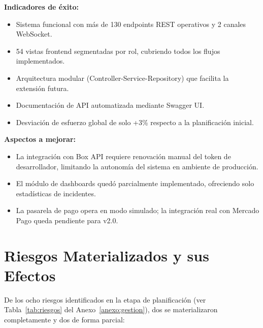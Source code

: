 \textbf{Indicadores de éxito:}
\begin{itemize}
    \item Sistema funcional con más de 130 endpoints REST operativos y 2 canales WebSocket.
    \item 54 vistas frontend segmentadas por rol, cubriendo todos los flujos implementados.
    \item Arquitectura modular (Controller-Service-Repository) que facilita la extensión futura.
    \item Documentación de API automatizada mediante Swagger UI.
    \item Desviación de esfuerzo global de solo +3\% respecto a la planificación inicial.
\end{itemize}

\textbf{Aspectos a mejorar:}
\begin{itemize}
    \item La integración con Box API requiere renovación manual del token de desarrollador, limitando la autonomía del sistema en ambiente de producción.
    \item El módulo de dashboards quedó parcialmente implementado, ofreciendo solo estadísticas de incidentes.
    \item La pasarela de pago opera en modo simulado; la integración real con Mercado Pago queda pendiente para v2.0.
\end{itemize}

\section{Riesgos Materializados y sus Efectos}

De los ocho riesgos identificados en la etapa de planificación (ver Tabla~\ref{tab:riesgos} del Anexo~\ref{anexo:gestion}), dos se materializaron completamente y dos de forma parcial:

